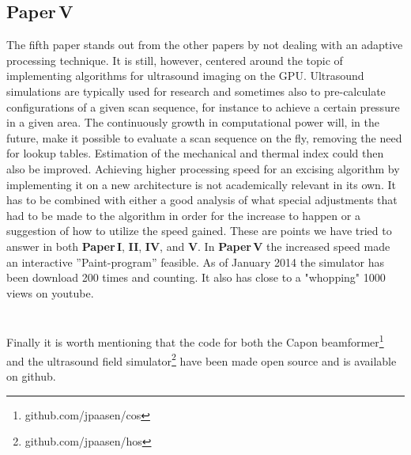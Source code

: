 \subsection{Paper\,V}
The fifth paper stands out from the other papers by not dealing with an adaptive processing technique. It is still, however, centered around the topic of implementing algorithms for ultrasound imaging on the GPU. Ultrasound simulations are typically used for research and sometimes also to pre-calculate configurations of a given scan sequence, for instance to achieve a certain pressure in a given area. The continuously growth in computational power will, in the future, make it possible to evaluate a scan sequence on the fly, removing the need for lookup tables. Estimation of the mechanical and thermal index could then also be improved. Achieving higher processing speed for an excising algorithm by implementing it on a new architecture is not academically relevant in its own. It has to be combined with either a good analysis of what special adjustments that had to be made to the algorithm in order for the increase to happen or a suggestion of how to utilize the speed gained. These are points we have tried to answer in both \textbf{Paper\,I}, \textbf{II},  \textbf{IV}, and \textbf{V}.  In \textbf{Paper\,V} the increased speed made an interactive ''Paint-program'' feasible. As of January 2014 the simulator has been download 200 times and counting. It also has close to a "whopping" 1000 views on youtube. 
\\\\\\
Finally it is worth mentioning that the code for both the Capon beamformer\footnote{github.com/jpaasen/cos} and the ultrasound field simulator\footnote{github.com/jpaasen/hos} have been made open source and is available on github. 
\endinput